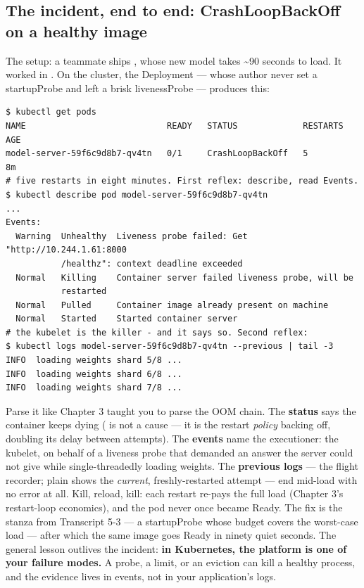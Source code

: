 \subsection*{The incident, end to end: CrashLoopBackOff on a healthy image}

The setup: a teammate ships , whose new model takes \textasciitilde{}90 seconds to load. It worked in . On the cluster, the Deployment — whose author never set a startupProbe and left a brisk livenessProbe — produces this:

\begin{terminalbox}
\begin{Verbatim}[breaklines=true,breakanywhere=true,fontsize=\small,formatcom=\color{tbbtermfg},codes=\tbbcodeactive]
$ kubectl get pods
NAME                            READY   STATUS             RESTARTS   AGE
model-server-59f6c9d8b7-qv4tn   0/1     CrashLoopBackOff   5          8m
# five restarts in eight minutes. First reflex: describe, read Events.
$ kubectl describe pod model-server-59f6c9d8b7-qv4tn
...
Events:
  Warning  Unhealthy  Liveness probe failed: Get "http://10.244.1.61:8000
           /healthz": context deadline exceeded
  Normal   Killing    Container server failed liveness probe, will be
           restarted
  Normal   Pulled     Container image already present on machine
  Normal   Started    Started container server
# the kubelet is the killer - and it says so. Second reflex:
$ kubectl logs model-server-59f6c9d8b7-qv4tn --previous | tail -3
INFO  loading weights shard 5/8 ...
INFO  loading weights shard 6/8 ...
INFO  loading weights shard 7/8 ...
\end{Verbatim}
\end{terminalbox}

Parse it like Chapter 3 taught you to parse the OOM chain. The \textbf{status} says the container keeps dying ( is not a cause — it is the restart \textit{policy} backing off, doubling its delay between attempts). The \textbf{events} name the executioner: the kubelet, on behalf of a liveness probe that demanded an answer the server could not give while single-threadedly loading weights. The \textbf{previous logs} — the flight recorder; plain  shows the \textit{current}, freshly-restarted attempt — end mid-load with no error at all. Kill, reload, kill: each restart re-pays the full load (Chapter 3's restart-loop economics), and the pod never once became Ready. The fix is the stanza from Transcript 5-3 — a startupProbe whose budget covers the worst-case load — after which the same image goes Ready in ninety quiet seconds. The general lesson outlives the incident: \textbf{in Kubernetes, the platform is one of your failure modes.} A probe, a limit, or an eviction can kill a healthy process, and the evidence lives in events, not in your application's logs.

